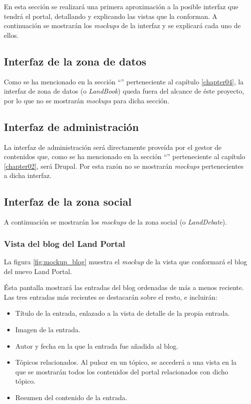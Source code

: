 En esta sección se realizará una primera aproximación a la posible interfaz que tendrá el portal, detallando y explicando las vistas que la conforman.  A continuación se mostrarán los \textit{mockups} de la interfaz y se explicará cada uno de ellos.



\subsection{Interfaz de la zona de datos}
Como se ha mencionado en la sección ``'' perteneciente al capítulo \ref{chapter04}, la interfaz de zona de datos (o \textit{LandBook}) queda fuera del alcance de éste proyecto, por lo que no se mostrarán \textit{mockups} para dicha sección.



\subsection{Interfaz de administración}
La interfaz de administración será directamente proveída por el gestor de contenidos que, como se ha mencionado en la sección ``'' perteneciente al capítulo \ref{chapter02}, será Drupal.  Por esta razón no se mostrarán \textit{mockups} pertenecientes a dicha interfaz.



\subsection{Interfaz de la zona social}
A continuación se mostrarán los \textit{mockups} de la zona social (o \textit{LandDebate}).


\subsubsection{Vista del blog del Land Portal}
La figura \ref{fig:mockup_blog} muestra el \textit{mockup} de la vista que conformará el blog del nuevo Land Portal.

Ésta pantalla mostrará las entradas del blog ordenadas de más a menos reciente.  Las tres entradas más recientes se destacarán sobre el resto, e incluirán:
\begin{itemize}
	\item Título de la entrada, enlazado a la vista de detalle de la propia entrada.
	\item Imagen de la entrada.
	\item Autor y fecha en la que la entrada fue añadida al blog.
	\item Tópicos relacionados.  Al pulsar en un tópico, se accederá a una vista en la que se mostrarán todos los contenidos del portal relacionados con dicho tópico.
	\item Resumen del contenido de la entrada.
\end{itemize}

